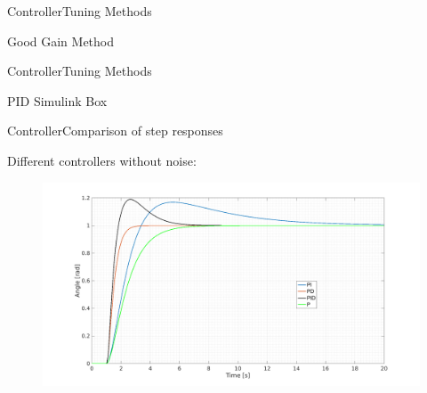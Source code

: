 \begin{frame}{Controller}{Tuning Methods}
  \begin{block}{Good Gain Method}

  
  \end{block}
\end{frame}

\begin{frame}{Controller}{Tuning Methods}
  \begin{block}{PID Simulink Box}

  
  \end{block}
\end{frame}

\begin{frame}{Controller}{Comparison of step responses}
  \begin{block}{Different controllers without noise:}

	  \begin{figure}
        \includegraphics[scale=0.20]{../report/figures/full_comp.png}
      \end{figure}
  
  \end{block}
\end{frame}

